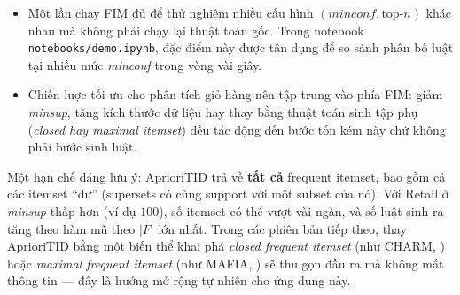 \begin{itemize}
    \item Một lần chạy FIM đủ để thử nghiệm nhiều cấu hình $(\textit{minconf}, \text{top-}n)$ khác nhau mà không phải chạy lại thuật toán gốc. Trong notebook \texttt{notebooks/demo.ipynb}, đặc điểm này được tận dụng để so sánh phân bố luật tại nhiều mức \textit{minconf} trong vòng vài giây.
    \item Chiến lược tối ưu cho phân tích giỏ hàng nên tập trung vào phía FIM: giảm \textit{minsup}, tăng kích thước dữ liệu hay thay bằng thuật toán sinh tập phụ (\emph{closed hay maximal itemset}) đều tác động đến bước tốn kém này chứ không phải bước sinh luật.
\end{itemize}

Một hạn chế đáng lưu ý: AprioriTID trả về \textbf{tất cả} frequent itemset, bao gồm cả các itemset ``dư'' (supersets có cùng support với một subset của nó). Với Retail ở \textit{minsup} thấp hơn (ví dụ $100$), số itemset có thể vượt vài ngàn, và số luật sinh ra tăng theo hàm mũ theo $|F|$ lớn nhất. Trong các phiên bản tiếp theo, thay AprioriTID bằng một biến thể khai phá \emph{closed frequent itemset} (như CHARM, \cite{ZakiHsiao2002CHARM}) hoặc \emph{maximal frequent itemset} (như MAFIA, \cite{Burdick2001MAFIA}) sẽ thu gọn đầu ra mà không mất thông tin --- đây là hướng mở rộng tự nhiên cho ứng dụng này.
